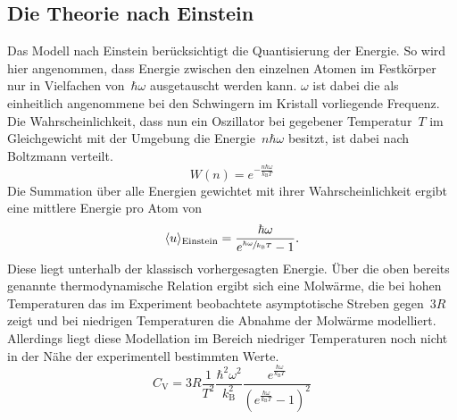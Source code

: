 \subsection{Die Theorie nach Einstein}
%
Das Modell nach Einstein berücksichtigt die Quantisierung der Energie. So
wird hier angenommen, dass Energie zwischen den einzelnen Atomen im Festkörper
nur in Vielfachen von~$\hbar\omega$ ausgetauscht werden kann. $\omega$ ist dabei
die als einheitlich angenommene bei den Schwingern im Kristall vorliegende
Frequenz. Die Wahrscheinlichkeit, dass nun ein Oszillator bei gegebener
Temperatur~$T$ im Gleichgewicht mit der Umgebung die Energie~$n\hbar\omega$
besitzt, ist dabei nach Boltzmann verteilt.
%
\begin{equation}
  W(n)=e^{-\frac{n\hbar\omega}{k_{\mathrm{B}}T}}
\end{equation}
%
Die Summation über alle Energien gewichtet mit ihrer Wahrscheinlichkeit ergibt
eine mittlere Energie pro Atom von
%
\begin{equation}
  \langle u\rangle_\text{Einstein}=\frac{\hbar\omega}{e^{\sfrac{\hbar\omega}{k_{\mathrm{B}}T}}-1}.
\end{equation}
%
Diese liegt unterhalb der klassisch vorhergesagten Energie. Über die oben
bereits genannte thermodynamische Relation ergibt sich eine Molwärme, die bei
hohen Temperaturen das im Experiment beobachtete asymptotische Streben
gegen~$3R$ zeigt und bei niedrigen Temperaturen die Abnahme der Molwärme
modelliert. Allerdings liegt diese Modellation im Bereich niedriger Temperaturen
noch nicht in der Nähe der experimentell bestimmten Werte.
%
\begin{equation}
  C_{\mathrm{V}}=3R\frac{1}{T^2}\frac{\hbar^2\omega^2}{k_{\mathrm{B}}^2}\frac{e^{\frac{\hbar\omega}{k_{\mathrm{B}}T}}}{(e^{\frac{\hbar\omega}{k_{\mathrm{B}}T}}-1)^2}
\end{equation}
%
